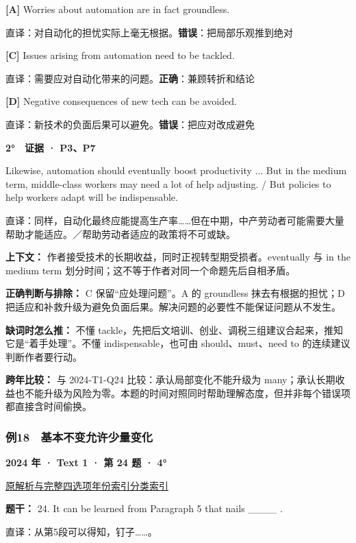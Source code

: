 \documentclass[11pt,a4paper]{article}
\begin{document}
\noindent\textbf{[A]} Worries about automation are in fact groundless.\par\nopagebreak
\noindent 直译：对自动化的担忧实际上毫无根据。\quad\textbf{错误}：把局部乐观推到绝对\par\smallskip
{}\noindent\textbf{[C]} Issues arising from automation need to be tackled.\par\nopagebreak
\noindent 直译：需要应对自动化带来的问题。\quad\textbf{正确}：兼顾转折和结论\par\smallskip
{}\noindent\textbf{[D]} Negative consequences of new tech can be avoided.\par\nopagebreak
\noindent 直译：新技术的负面后果可以避免。\quad\textbf{错误}：把应对改成避免\par\smallskip
\begin{evidence}\textbf{2°　证据 · P3、P7}\par Likewise, automation should eventually boost productivity ... But in the medium term, middle-class workers may need a lot of help adjusting. / But policies to help workers adapt will be indispensable.\par 直译：同样，自动化最终应能提高生产率……但在中期，中产劳动者可能需要大量帮助才能适应。／帮助劳动者适应的政策将不可或缺。\end{evidence}
\noindent\textbf{上下文：} 作者接受技术的长期收益，同时正视转型期受损者。eventually 与 in the medium term 划分时间；这不等于作者对同一个命题先后自相矛盾。\par\smallskip
\noindent\textbf{正确判断与排除：} C 保留“应处理问题”。A 的 groundless 抹去有根据的担忧；D 把适应和补救升级为避免负面后果。解决问题的必要性不能保证问题从不发生。\par\smallskip
\noindent\textbf{缺词时怎么推：} 不懂 tackle，先把后文培训、创业、调税三组建议合起来，推知它是“着手处理”。不懂 indispensable，也可由 should、must、need to 的连续建议判断作者要行动。\par\smallskip
\noindent\textbf{跨年比较：} 与 2024-T1-Q24 比较：承认局部变化不能升级为 many；承认长期收益也不能升级为风险为零。本题的时间对照同时帮助理解态度，但并非每个错误项都直接含时间偷换。\par\smallskip
\clearpage
\subsubsection{例18　基本不变允许少量变化}\label{case-2024-T1-Q24}
\noindent\textbf{2024 年 · Text 1 · 第 24 题 · 4°}\par\noindent \href{https://zj139.github.io/math-notes/english/71d645546a599469a4b050c3/\#q24}{原解析与完整四选项}\quad \hyperref[idx-2024-T1-Q24]{年份索引}\quad \hyperref[class-R08]{分类索引}\par\smallskip
\noindent\textbf{题干：} 24. It can be learned from Paragraph 5 that nails \_\_\_\_ .\par\smallskip
直译：从第5段可以得知，钉子……。
\end{document}
